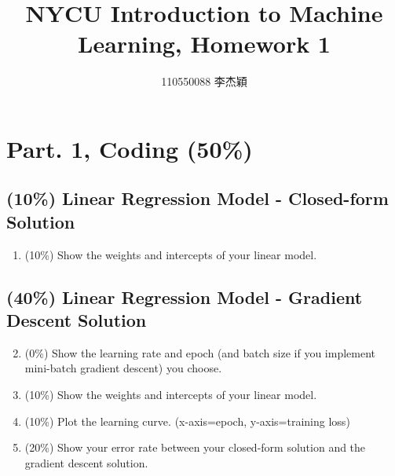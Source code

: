 \documentclass[twocolumn]{extarticle}
\title{NYCU Introduction to Machine Learning, Homework 1}
\author{110550088 李杰穎}
\date{}
\begin{document}
\maketitle

\section{Part. 1, Coding (50\%)}
\subsection{(10\%) Linear Regression Model - Closed-form Solution}
\begin{enumerate}
\item (10\%)  Show the weights and intercepts of your linear model.
\end{enumerate}

\subsection{(40\%) Linear Regression Model - Gradient Descent Solution}

\begin{enumerate}
\setcounter{enumi}{1}
\item (0\%)   Show the learning rate and epoch (and batch size if you implement mini-batch gradient descent) you choose.
\item (10\%) Show the weights and intercepts of your linear model.
\item (10\%) Plot the learning curve. (x-axis=epoch, y-axis=training loss)
\item (20\%) Show your error rate between your closed-form solution and the gradient descent solution.
\end{enumerate}
\end{document}
